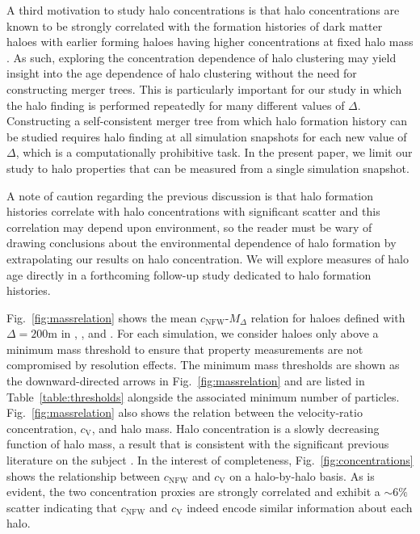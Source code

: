 \documentclass[usenatbib,fleqn]{mnras}
\begin{document}
A third motivation to study halo concentrations is that halo concentrations are known to be strongly correlated with the formation histories of dark matter haloes with earlier forming haloes having higher concentrations at fixed halo mass \citep{wechsler_etal02, zhao_etal03, wechsler_etal06, zhao_etal09}. As such, exploring the concentration dependence of halo clustering may yield insight into the age dependence of halo clustering without the need for constructing merger trees. This is particularly important for our study in which the halo finding is performed repeatedly for many different values of $\Delta$. Constructing a self-consistent merger tree from which halo formation history can be studied requires halo finding at all simulation snapshots for each new value of $\Delta$, which is a computationally prohibitive task. In the present paper, we limit our study to halo properties that can be measured from a single simulation 
snapshot. 

A note of caution regarding the previous discussion is that halo formation histories correlate with halo concentrations with significant scatter and this correlation may depend upon environment, so the reader must be wary of drawing conclusions about the environmental dependence of halo formation by extrapolating our results on halo concentration. We will explore measures of halo age directly in a forthcoming follow-up study dedicated to halo formation histories.

Fig.~\ref{fig:massrelation} shows the mean $c_{\mathrm{NFW}}$-$M_{\Delta}$ relation for haloes defined with $\Delta=200$m in \simA, \simB, and \simC. For each simulation, we consider haloes only above a minimum mass threshold to ensure that property measurements are not compromised by resolution effects. The minimum mass thresholds are shown as the downward-directed arrows in Fig.~\ref{fig:massrelation} and are listed in Table~\ref{table:thresholds} alongside the associated minimum number of particles. Fig.~\ref{fig:massrelation} also shows the relation between the velocity-ratio concentration, $c_{\mathrm{V}}$, and halo mass. Halo concentration is a slowly decreasing function of halo mass, a result that is consistent with the significant previous literature on the subject \citep[e.g.,][and references therein]{maccio_etal07,duffy_etal08,prada_etal12,klypin_etal16}.  In the interest of completeness, Fig.~\ref{fig:concentrations} shows the relationship between $c_{\mathrm{NFW}}$ and $c_{\mathrm{V}}$ on a halo-by-halo basis. As is evident, the two concentration proxies are strongly correlated and exhibit a $\sim 6\%$ scatter indicating that $c_{\mathrm{NFW}}$ and $c_{\mathrm{V}}$ indeed encode similar information about each halo. 
\end{document}
